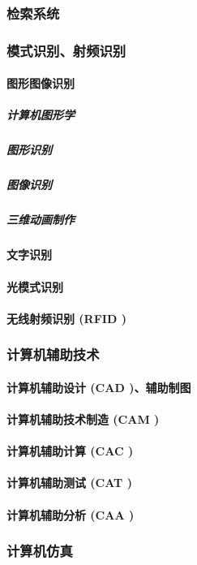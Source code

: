 \documentclass[UTF8]{../../ApplicationUniverse}
\begin{document}
        \subsubsection{检索系统}
        \subsubsection{模式识别、射频识别}
            \paragraph{图形图像识别}
                \subparagraph{计算机图形学}
                \subparagraph{图形识别}
                \subparagraph{图像识别}
                \subparagraph{三维动画制作}
            \paragraph{文字识别}
            \paragraph{光模式识别}
            \paragraph{无线射频识别 (RFID )}
        \subsubsection{计算机辅助技术}
            \paragraph{计算机辅助设计 (CAD )、辅助制图}
            \paragraph{计算机辅助技术制造 (CAM )}
            \paragraph{计算机辅助计算 (CAC )}
            \paragraph{计算机辅助测试 (CAT )}
            \paragraph{计算机辅助分析 (CAA )}
        \subsubsection{计算机仿真}
\end{document}
